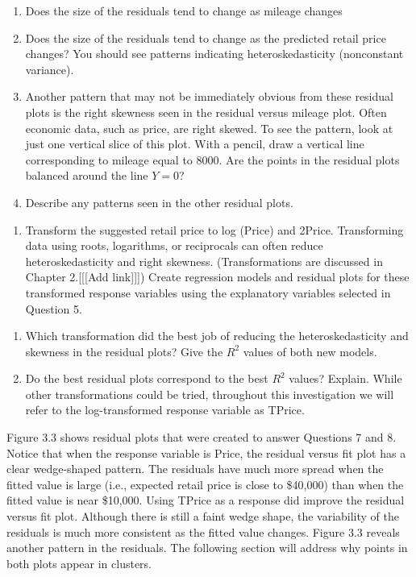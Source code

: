 \documentclass[
]{report}
\providecommand{\tightlist}{%
  \setlength{\itemsep}{0pt}\setlength{\parskip}{0pt}}
\theoremstyle{definition}
\theoremstyle{definition}
\theoremstyle{definition}
\theoremstyle{definition}
\theoremstyle{remark}
\begin{document}
\begin{enumerate}
\def\labelenumi{\alph{enumi}.}
\item
  Does the size of the residuals tend to change as mileage changes
\item
  Does the size of the residuals tend to change as the predicted retail price changes? You should see patterns indicating heteroskedasticity (nonconstant variance).
\item
  Another pattern that may not be immediately obvious from these residual plots is the right skewness seen in the residual versus mileage plot. Often economic data, such as price, are right skewed. To see the pattern, look at just one vertical slice of this plot. With a pencil, draw a vertical line corresponding to mileage equal to 8000. Are the points in the residual plots balanced around the line \(Y = 0\)?
\item
  Describe any patterns seen in the other residual plots.
\end{enumerate}

\begin{enumerate}
\def\labelenumi{\arabic{enumi}.}
\setcounter{enumi}{7}
\tightlist
\item
  Transform the suggested retail price to log (Price) and 2Price. Transforming data using roots, logarithms, or reciprocals can often reduce heteroskedasticity and right skewness. (Transformations are discussed in Chapter 2.{[}{[}{[}Add link{]}{]}{]}) Create regression models and residual plots for these transformed response variables using the
  explanatory variables selected in Question 5.
\end{enumerate}

\begin{enumerate}
\def\labelenumi{\alph{enumi}.}
\item
  Which transformation did the best job of reducing the heteroskedasticity and skewness in the residual plots? Give the \(R^2\) values of both new models.
\item
  Do the best residual plots correspond to the best \(R^2\) values? Explain.
  While other transformations could be tried, throughout this investigation we will refer to the log-transformed response variable as TPrice.
\end{enumerate}

Figure 3.3 shows residual plots that were created to answer Questions 7 and 8. Notice that when the response variable is Price, the residual versus fit plot has a clear wedge-shaped pattern. The residuals have much more spread when the fitted value is large (i.e., expected retail price is close to \$40,000) than when the fitted value is near \$10,000. Using TPrice as a response did improve the residual versus fit plot. Although
there is still a faint wedge shape, the variability of the residuals is much more consistent as the fitted value changes. Figure 3.3 reveals another pattern in the residuals. The following section will address why points in both plots appear in clusters.
\end{document}
